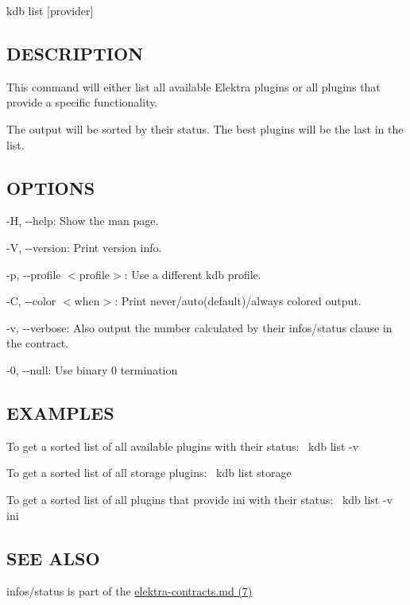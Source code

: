 {\ttfamily kdb list \mbox{[}provider\mbox{]}}

\subsection*{D\+E\+S\+C\+R\+I\+P\+T\+I\+ON}

This command will either list all available Elektra plugins or all plugins that provide a specific functionality.

The output will be sorted by their status. The best plugins will be the last in the list.

\subsection*{O\+P\+T\+I\+O\+NS}


\begin{DoxyItemize}
\item {\ttfamily -\/H}, {\ttfamily -\/-\/help}\+: Show the man page.
\item {\ttfamily -\/V}, {\ttfamily -\/-\/version}\+: Print version info.
\item {\ttfamily -\/p}, {\ttfamily -\/-\/profile $<$profile$>$}\+: Use a different kdb profile.
\item {\ttfamily -\/C}, {\ttfamily -\/-\/color $<$when$>$}\+: Print never/auto(default)/always colored output.
\item {\ttfamily -\/v}, {\ttfamily -\/-\/verbose}\+: Also output the number calculated by their {\ttfamily infos/status} clause in the contract.
\item {\ttfamily -\/0}, {\ttfamily -\/-\/null}\+: Use binary 0 termination
\end{DoxyItemize}

\subsection*{E\+X\+A\+M\+P\+L\+ES}

To get a sorted list of all available plugins with their status\+:~\newline
 {\ttfamily kdb list -\/v}

To get a sorted list of all storage plugins\+:~\newline
 {\ttfamily kdb list storage}

To get a sorted list of all plugins that provide {\ttfamily ini} with their status\+:~\newline
 {\ttfamily kdb list -\/v ini}

\subsection*{S\+EE A\+L\+SO}


\begin{DoxyItemize}
\item {\ttfamily infos/status} is part of the \hyperlink{md_doc_help_elektra-contracts_doc_help_elektra-contracts_md}{elektra-\/contracts.md (7)} 
\end{DoxyItemize}